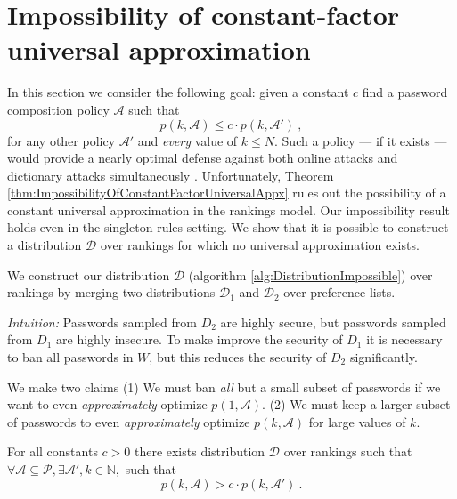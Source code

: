 \documentclass[prodmode,acmec]{ec-acmsmall}
\newcommand{\PasswordSpace}{\mathcal{P}}
\begin{document}
\section{Impossibility of constant-factor universal approximation} \label{subsec:ImposibilityOfConstantFactorUniversalAppx}
In this section we consider the following goal: given a constant $c$ find a password composition policy $\mathcal{A}$ such that 
\[ p\left(k,\mathcal{A} \right) \leq c \cdot p\left(k,\mathcal{A}'\right) \  , \]
for any other policy $\mathcal{A} '$ and {\em every} value of $k \leq N$. Such a policy --- if it exists --- would provide a nearly optimal defense against both online attacks and dictionary attacks simultaneously \cite{seeley1989password}. Unfortunately, Theorem \ref{thm:ImpossibilityOfConstantFactorUniversalAppx} rules out the possibility of a constant universal approximation in the rankings model. Our impossibility result holds even in the singleton rules setting. We show that it is possible to construct a distribution $\mathcal{D}$ over rankings for which no universal approximation exists.

We construct our distribution $\mathcal{D}$ (algorithm \ref{alg:DistributionImpossible}) over rankings by merging two distributions $\mathcal{D}_1$ and $\mathcal{D}_2$ over preference lists. 

{\em Intuition:} Passwords sampled from $D_2$ are highly secure, but passwords sampled from $D_1$ are highly insecure. To make improve the security of $D_1$ it is necessary to ban all passwords in $W$, but this reduces the security of $D_2$ significantly. 

We make two claims (1) We must ban {\em all} but a small subset of passwords if we want to even {\em approximately} optimize  $p\left(1,\mathcal{A} \right)$. (2) We must keep a larger subset of passwords to even {\em approximately} optimize $p\left(k,\mathcal{A}\right)$ for large values of $k$. 





\begin{theorem} \label{thm:ImpossibilityOfConstantFactorUniversalAppx}
For all constants $c>0$ there exists distribution $\mathcal{D}$ over rankings such that $\forall \mathcal{A} \subseteq \PasswordSpace, \exists \mathcal{A}', k \in \mathbb{N},$ such that 
 \[ p\left(k,\mathcal{A} \right) > c \cdot p\left(k,\mathcal{A}'\right) \ . \]
\end{theorem}
\end{document}
